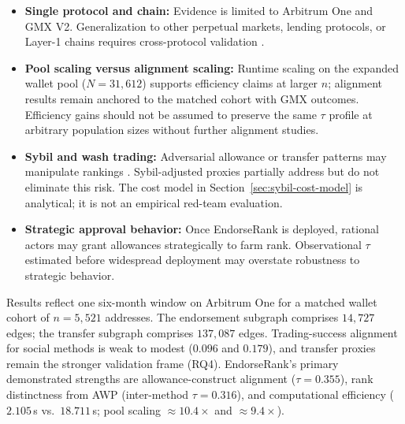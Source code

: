 
\begin{itemize}
\item \textbf{Single protocol and chain:} Evidence is limited to Arbitrum One and GMX V2. Generalization to other perpetual markets, lending protocols, or Layer-1 chains requires cross-protocol validation .

\item \textbf{Pool scaling versus alignment scaling:} Runtime scaling on the expanded wallet pool ($N=31{,}612$) supports efficiency claims at larger $n$; alignment results remain anchored to the matched cohort with GMX outcomes. Efficiency gains should not be assumed to preserve the same $\tau$ profile at arbitrary population sizes without further alignment studies.
\end{itemize}


\begin{itemize}
\item \textbf{Sybil and wash trading:} Adversarial allowance or transfer patterns may manipulate rankings . Sybil-adjusted proxies partially address but do not eliminate this risk. The cost model in Section~\ref{sec:sybil-cost-model} is analytical; it is not an empirical red-team evaluation.

\item \textbf{Strategic approval behavior:} Once EndorseRank is deployed, rational actors may grant allowances strategically to farm rank. Observational $\tau$ estimated before widespread deployment may overstate robustness to strategic behavior.
\end{itemize}


Results reflect one six-month window on Arbitrum One for a matched wallet cohort of $n=5{,}521$ addresses. The endorsement subgraph comprises $14{,}727$ edges; the transfer subgraph comprises $137{,}087$ edges. Trading-success alignment for social methods is weak to modest ($0.096$ and $0.179$), and transfer proxies remain the stronger validation frame (RQ4). EndorseRank's primary demonstrated strengths are allowance-construct alignment ($\tau=0.355$), rank distinctness from AWP (inter-method $\tau=0.316$), and computational efficiency ($2.105$\,s vs.\ $18.711$\,s; pool scaling $\approx 10.4\times$ and $\approx 9.4\times$).

